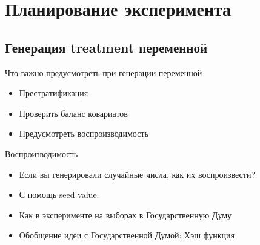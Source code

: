 

\section{Планирование эксперимента}

\subsection{Генерация treatment переменной}

\begin{frame}{Что важно предусмотреть при генерации переменной}

\begin{itemize}[<+->]
    \item Престратификация
    \item Проверить баланс ковариатов
    \item Предусмотреть воспроизводимость
\end{itemize}

\end{frame}

\begin{frame}{Воспроизводимость}

\begin{itemize}
    \item Если вы генерировали случайные числа, как их воспроизвести?
    \item С помощь seed value. %
    \item Как в эксперименте на выборах в Государственную Думу
    \item Обобщение идеи с Государственной Думой: Хэш функция
\end{itemize}

\end{frame}



